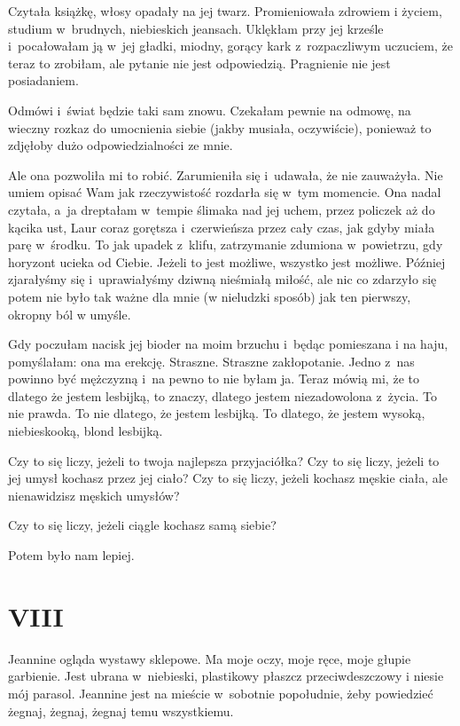 \documentclass[oneside,polish,12pt,sfheadings]{mwbk}
\begin{document}
Czytała książkę, włosy opadały na jej twarz. Promieniowała zdrowiem
i życiem, studium w~brudnych, niebieskich jeansach. Uklękłam przy
jej krześle i~pocałowałam ją w~jej gładki, miodny, gorący kark z~rozpaczliwym
uczuciem, że teraz to zrobiłam, ale pytanie nie jest odpowiedzią.
Pragnienie nie jest posiadaniem.

Odmówi i~świat będzie taki sam znowu. Czekałam pewnie na odmowę, na
wieczny rozkaz do umocnienia siebie (jakby musiała, oczywiście), ponieważ
to zdjęłoby dużo odpowiedzialności ze mnie.

Ale ona pozwoliła mi to robić. Zarumieniła się i~udawała, że nie zauważyła.
Nie umiem opisać Wam jak rzeczywistość rozdarła się w~tym momencie.
Ona nadal czytała, a~ja dreptałam w~tempie ślimaka nad jej uchem,
przez policzek aż do kącika ust, Laur coraz gorętsza i~czerwieńsza
przez cały czas, jak gdyby miała parę w~środku. To jak upadek z~klifu,
zatrzymanie zdumiona w~powietrzu, gdy horyzont ucieka od Ciebie. Jeżeli
to jest możliwe, wszystko jest możliwe. Później zjarałyśmy się i~uprawiałyśmy
dziwną nieśmiałą miłość, ale nic co zdarzyło się potem nie było tak
ważne dla mnie (w nieludzki sposób) jak ten pierwszy, okropny ból
w umyśle.

Gdy poczułam nacisk jej bioder na moim brzuchu i~będąc pomieszana
i na haju, pomyślałam: ona ma erekcję. Straszne. Straszne zakłopotanie.
Jedno z~nas powinno być mężczyzną i~na pewno to nie byłam ja. Teraz
mówią mi, że to dlatego że jestem lesbijką, to znaczy, dlatego jestem
niezadowolona z~życia. To nie prawda. To nie dlatego, że jestem lesbijką.
To dlatego, że jestem wysoką, niebieskooką, blond lesbijką.

Czy to się liczy, jeżeli to twoja najlepsza przyjaciółka? Czy to się
liczy, jeżeli to jej umysł kochasz przez jej ciało? Czy to się liczy,
jeżeli kochasz męskie ciała, ale nienawidzisz męskich umysłów?

Czy to się liczy, jeżeli ciągle kochasz samą siebie?

Potem było nam lepiej.

\chapter{VIII}

Jeannine ogląda wystawy sklepowe. Ma moje oczy, moje ręce, moje głupie
garbienie. Jest ubrana w~niebieski, plastikowy płaszcz przeciwdeszczowy
i niesie mój parasol. Jeannine jest na mieście w~sobotnie popołudnie,
żeby powiedzieć żegnaj, żegnaj, żegnaj temu wszystkiemu.
\end{document}
